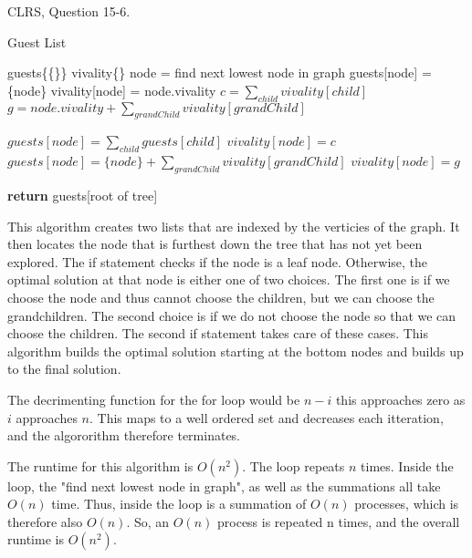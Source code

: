 \documentclass{article}
\begin{document}
\nextprob
CLRS, Question 15-6.


\begin{algorithm}
    \caption{Guest List}\label{guests}
    \begin{algorithmic}[1]
        \State guests\{\{\}\}
        \State vivality\{\}
			\State node = find next lowest node in graph
				\State guests[node] = \{node\}
				\State vivality[node] = node.vivality
			\Else
				\State $c = \sum_{child} vivality[child]$
				\State $g = node.vivality + \sum_{grandChild} vivality[grandChild]$

					\State $guests[node] = \sum_{child} guests[child]$
					\State $vivality[node] = c$
				\Else
					\State $guests[node] = \{node\} + \sum_{grandChild} vivality[grandChild]$
					\State $vivality[node] = g$
				\EndIf
			\EndIf
		\EndFor

       \State \textbf{return} guests[root of tree]

    \EndFunction
    \end{algorithmic}
\end{algorithm}

This algorithm creates two lists that are indexed by the verticies of the graph. It then locates the node that is furthest down the tree that has not yet been explored. The if statement checks if the node is a leaf node. Otherwise, the optimal solution at that node is either one of two choices. The first one is if we choose the node and thus cannot choose the children, but we can choose the grandchildren. The second choice is if we do not choose the node so that we can choose the children. The second if statement takes care of these cases. This algorithm builds the optimal solution starting at the bottom nodes and builds up to the final solution.

The decrimenting function for the for loop would be $n - i$ this approaches zero as $i$
 approaches $n$. This maps to a well ordered set and decreases each itteration, and the algororithm therefore terminates.
 
 The runtime for this algorithm is $O(n^2)$. The loop repeats $n$ times. Inside the loop, the "find next lowest node in graph", as well as the summations all take $O(n)$ time. Thus, inside the loop is a summation of $O(n)$ processes, which is therefore also $O(n)$. So, an $O(n)$ process is repeated n times, and the overall runtime is $O(n^2)$.
 
\end{document}
